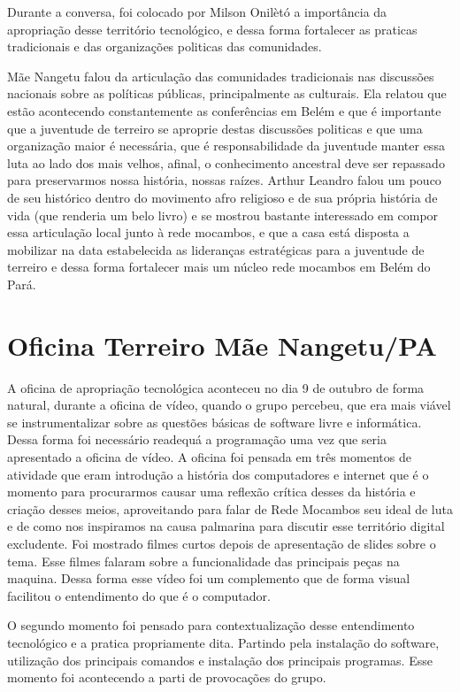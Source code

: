 \documentclass[a4paper, 11pt, oneside]{Relatorio_sem}  %
\begin{document}
Durante a conversa, foi colocado por Milson Onilètó a importância da
apropriação desse território tecnológico, e dessa forma fortalecer as
praticas tradicionais e das organizações politicas das comunidades.

Mãe Nangetu falou da articulação das comunidades tradicionais nas
discussões nacionais sobre as políticas públicas, principalmente as
culturais. Ela relatou que estão acontecendo constantemente as
conferências em Belém e que é importante que a juventude de terreiro
se aproprie destas discussões politicas e que uma organização maior é
necessária, que é responsabilidade da juventude manter essa luta ao
lado dos mais velhos, afinal, o conhecimento ancestral deve ser
repassado para preservarmos nossa história, nossas raízes. Arthur
Leandro falou um pouco de seu histórico dentro do movimento afro
religioso e de sua própria história de vida (que renderia um belo
livro) e se mostrou bastante interessado em compor essa articulação
local junto à rede mocambos, e que a casa está disposta a mobilizar na
data estabelecida as lideranças estratégicas para a juventude de
terreiro e dessa forma fortalecer mais um núcleo rede mocambos em
Belém do Pará.  

\section{Oficina Terreiro Mãe Nangetu/PA}
A oficina de apropriação tecnológica aconteceu no dia 9 de outubro de
forma natural, durante a oficina de vídeo, quando o grupo percebeu,
que era mais viável se instrumentalizar sobre as questões básicas de
software livre e informática. Dessa forma foi necessário readequá a
programação uma vez que seria apresentado a oficina de vídeo. A
oficina foi pensada em três momentos de atividade que eram introdução
a história dos computadores e internet que é o momento para
procurarmos causar uma reflexão crítica desses da história e criação
desses meios, aproveitando para falar de Rede Mocambos seu ideal de
luta e de como nos inspiramos na causa palmarina para discutir esse
território digital excludente. Foi mostrado filmes curtos depois de
apresentação de slides sobre o tema. Esse filmes falaram sobre a
funcionalidade das principais peças na maquina. Dessa forma esse vídeo
foi um complemento que de forma visual facilitou o entendimento do que
é o computador.

O segundo momento foi pensado para contextualização desse entendimento
tecnológico e a pratica propriamente dita. Partindo pela instalação do
software, utilização dos principais comandos e instalação dos
principais programas. Esse momento foi acontecendo a parti de
provocações do grupo.
\end{document}
